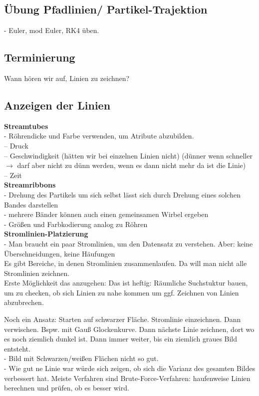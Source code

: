 \documentclass{article}
\begin{document}
\subsection{Übung Pfadlinien/ Partikel-Trajektion}
- Euler, mod Euler, RK4 üben.\\

\subsection{Terminierung}
Wann hören wir auf, Linien zu zeichnen?\\

\subsection{Anzeigen der Linien}
\textbf{Streamtubes}\\
- Röhrendicke und Farbe verwenden, um Atribute abzubilden.\\
-- Druck\\
-- Geschwindigkeit (hätten wir bei einzelnen Linien nicht) (dünner wenn schneller $\rightarrow$ darf aber nicht zu dünn werden, wenn es dann nicht mehr da ist die Linie)\\
-- Zeit\\

\noindent \textbf{Streamribbons}\\
- Drehung des Partikels um sich selbst lässt sich durch Drehung eines solchen Bandes darstellen\\
- mehrere Bänder können auch einen gemeinsamen Wirbel ergeben\\
- Größen und Farbkodierung analog zu Röhren\\

\noindent \textbf{Stromlinien-Platzierung}\\
- Man braucht ein paar Stromlinien, um den Datensatz zu verstehen. Aber: keine Überschneidungen, keine Häufungen\\
Es gibt Bereiche, in denen Stromlinien zusammenlaufen. Da will man nicht alle Stromlinien zeichnen.\\
Erste Möglichkeit das anzugehen:
Das ist heftig:  Räumliche Suchstuktur bauen, um zu checken, ob sich Linien zu nahe kommen um ggf. Zeichnen von Linien abzubrechen.

\noindent Noch ein Ansatz:
Starten auf schwarzer Fläche. Stromlinie einzeichnen. Dann verwischen. Bspw. mit Gauß Glockenkurve. Dann nächste Linie zeichnen, dort wo es noch ziemlich dunkel ist. Dann immer weiter, bis ein ziemlich graues Bild entsteht.\\
- Bild mit Schwarzen/weißen Flächen nicht so gut.\\
- Wie gut ne Linie war würde sich zeigen, ob sich die Varianz  des gesamten Bildes verbessert hat.
Meiste Verfahren sind Brute-Force-Verfahren: haufenweise Linien berechnen und prüfen, ob es besser wird.
\end{document}
